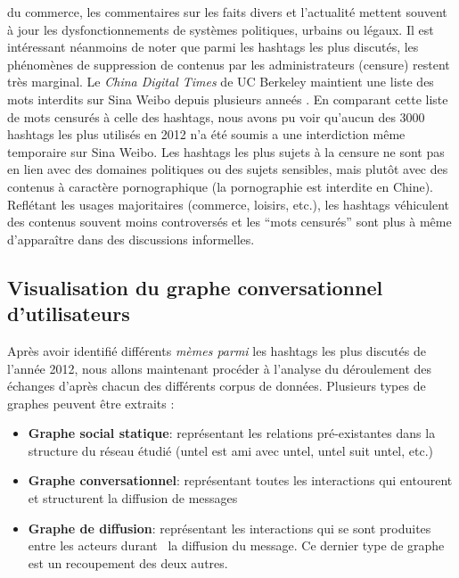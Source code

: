 du commerce, les commentaires sur les faits divers et l{\textquoteright}actualité mettent souvent à jour les dysfonctionnements de systèmes politiques, urbains ou légaux. Il est intéressant néanmoins de noter que parmi les hashtags les plus discutés, les phénomènes de suppression de contenus par les administrateurs (censure) restent très marginal. Le \textit{China Digital Times} de UC Berkeley maintient une liste des mots interdits sur Sina Weibo depuis plusieurs anneés \citep{Ng2013}. En comparant cette liste de mots censurés à celle des hashtags, nous avons pu voir qu{\textquoteright}aucun des 3000 hashtags les plus utilisés en 2012 n{\textquoteright}a été soumis a une interdiction m\^eme temporaire sur Sina Weibo. Les hashtags les plus sujets à la censure ne sont pas en lien avec des domaines politiques ou des sujets sensibles, mais plut\^ot avec des contenus à caractère pornographique (la pornographie est interdite en Chine). Reflétant les usages majoritaires (commerce, loisirs, etc.), les hashtags véhiculent des contenus souvent moins controversés et les {\textquotedblleft}mots censurés{\textquotedblright} sont plus à m\^eme d{\textquoteright}appara\^itre dans des discussions informelles.

\subsection[Visualisation du graphe conversationnel d{\textquoteright}utilisateurs]{Visualisation du graphe conversationnel d{\textquoteright}utilisateurs}

Après avoir identifié différents \textit{mèmes parmi }les hashtags les plus discutés de l{\textquoteright}année 2012, nous allons maintenant procéder à l{\textquoteright}analyse du déroulement des échanges d{\textquoteright}après chacun des différents corpus de données. Plusieurs types de graphes peuvent \^etre extraits :

\begin{itemize}
\item \textbf{Graphe social statique}: représentant les relations pré-existantes dans la structure du réseau étudié (untel est ami avec untel, untel suit untel, etc.)
\item \textbf{Graphe conversationnel}: représentant toutes les interactions qui entourent et structurent la diffusion de messages 
\item \textbf{Graphe de diffusion}: représentant les interactions qui se sont produites entre les acteurs durant \ la diffusion du message. Ce dernier type de graphe est un recoupement des deux autres.
\end{itemize}


